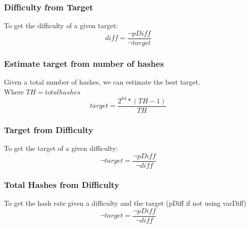 \documentclass[12pt]{article}
\begin{document}
    \subsubsection{Difficulty from Target}
    To get the difficulty of a given target:
    \large{\[
    diff = \frac{\neg pDiff}{\neg target}
    \]}
    
    \subsubsection{Estimate target from number of hashes}
    Given a total number of hashes, we can estimate the best target.\\ Where $TH = totalhashes$
     \large{\[
    target=\frac{2^{64}*(TH-1)}{TH}
    \]}
    
        
    \subsubsection{Target from Difficulty}
    To get the target of a given difficulty:
    \large{\[
    \neg target = \frac{\neg pDiff}{\neg diff}
    \]}
    
    \subsubsection{Total Hashes from Difficulty}
    To get the hash rate given a difficulty and the target (pDiff if not using varDiff)
    \large{\[
    \neg target = \frac{\neg pDiff}{\neg diff}
    \]}
\end{document}
